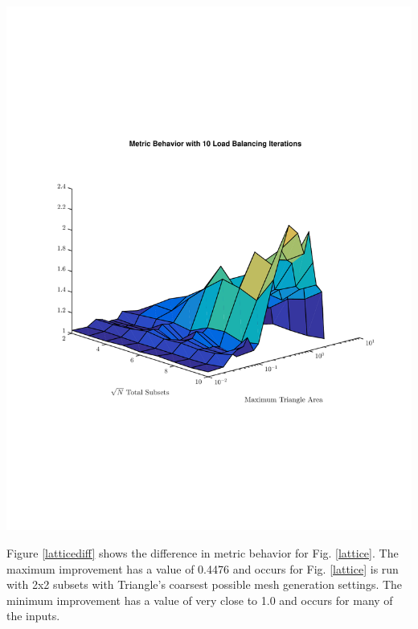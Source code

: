 \noindent\begin{minipage}{\textwidth}
\centering
\includegraphics[scale=0.80, trim = 2cm 6cm 2cm 7cm,clip]{figures/lattice_iter.pdf}
\label{latticeiter}
\end{minipage}
\smallskip

Figure \ref{latticediff} shows the difference in metric behavior for Fig. \ref{lattice}. The maximum improvement has a value of 0.4476 and occurs for Fig. \ref{lattice} is run with 2x2 subsets with Triangle's coarsest possible mesh generation settings. The minimum improvement has a value of very close to 1.0 and occurs for many of the inputs. 

